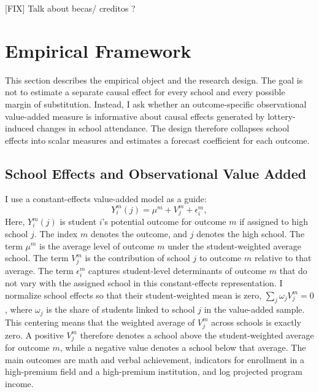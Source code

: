 \documentclass[a4paper, article, english, oneside, unknownkeysallowed, 12pt]{memoir}
\begin{document}
[FIX] Talk about becas/ creditos ? 

\clearpage 
\section{Empirical Framework}

This section describes the empirical object and the research design.
The goal is not to estimate a separate causal effect for every school and every possible margin of substitution.
Instead, I ask whether an outcome-specific observational value-added measure is informative about causal effects generated by lottery-induced changes in school attendance.
The design therefore collapses school effects into scalar measures and estimates a forecast coefficient for each outcome.

\subsection{School Effects and Observational Value Added}

I use a constant-effects value-added model as a guide:
\begin{equation}
  Y_i^m(j) = \mu^m + V_j^m + \epsilon_i^m,
  \label{eq:potential-va}
\end{equation}
Here, $Y_i^m(j)$ is student $i$'s potential outcome for outcome $m$ if assigned to high school $j$.
The index $m$ denotes the outcome, and $j$ denotes the high school.
The term $\mu^m$ is the average level of outcome $m$ under the student-weighted average school.
The term $V_j^m$ is the contribution of school $j$ to outcome $m$ relative to that average.
The term $\epsilon_i^m$ captures student-level determinants of outcome $m$ that do not vary with the assigned school in this constant-effects representation.
I normalize school effects so that their student-weighted mean is zero, $\sum_j \omega_j V_j^m = 0$, where $\omega_j$ is the share of students linked to school $j$ in the value-added sample.
This centering means that the weighted average of $V_j^m$ across schools is exactly zero.
A positive $V_j^m$ therefore denotes a school above the student-weighted average for outcome $m$, while a negative value denotes a school below that average.
The main outcomes are math and verbal achievement, indicators for enrollment in a high-premium field and a high-premium institution, and log projected program income. 
\end{document}
